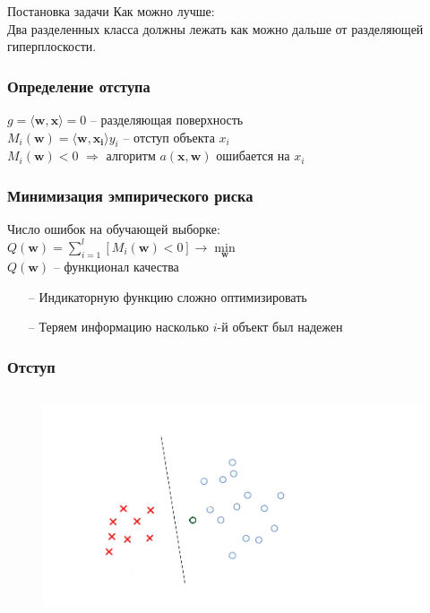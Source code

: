 \documentclass[10pt]{beamer}
\begin{document}
\begin{frame}{Постановка задачи}
  Как можно лучше:\\
  Два разделенных класса должны лежать как можно дальше от разделяющей гиперплоскости.
\end{frame}

\begin{frame}\frametitle{Определение отступа}
	${g = \langle \mathbf{w}, \mathbf{x}\rangle = 0}$ -- разделяющая поверхность\\
	$M_i(\mathbf{w}) = \langle \mathbf{w}, \mathbf{x_i}\rangle y_i$ -- отступ объекта $x_i$\\
	${M_i(\mathbf{w})<0}$ $\Rightarrow$ алгоритм $a(\mathbf{x},\mathbf{w})$ ошибается на $x_i$
\end{frame}

\begin{frame}\frametitle{Минимизация эмпирического риска}
	Число ошибок на обучающей выборке:\\
	\bigbreak
	${Q(\mathbf{w}) = \sum\limits_{i=1}^l \left[ M_i(\mathbf{w}) < 0 \right] \rightarrow \min\limits_{\mathbf{w}} }$\\
	\bigbreak
	${Q(\mathbf{w})}$ -- функционал качества\\
	\bigbreak
	\pause
  \begin{itemize}[<+->]
		\item[--] Индикаторную функцию сложно оптимизировать
		\item[--] Теряем информацию насколько ${i}$-й объект был надежен
	\end{itemize}
\end{frame}

\begin{frame}\frametitle{Отступ}
	\begin{figure}[htbp]
	  \includegraphics[height=190pt, keepaspectratio = true]{images/margin1}
	\end{figure}
\end{frame}
\end{document}
